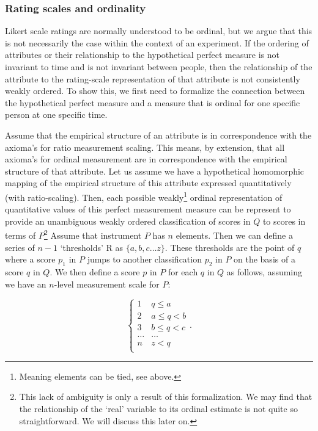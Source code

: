 \documentclass[utf8]{FrontiersinVancouver}
\begin{document}
\subsubsection{Rating scales and ordinality}
Likert scale ratings are normally understood to be ordinal, but we argue that this is not necessarily the case within the context of an experiment. If the ordering of attributes or their relationship to the hypothetical perfect measure is not invariant to time and is not invariant between people, then the relationship of the attribute to the rating-scale representation of that attribute is not consistently weakly ordered. To show this, we first need to formalize the connection between the hypothetical perfect measure and a measure that is ordinal for one specific person at one specific time.

Assume that the empirical structure of an attribute is in correspondence with the axioma's for ratio measurement scaling. This means, by extension, that all axioma's for ordinal measurement are in correspondence with the empirical structure of that attribute. Let us assume we have a hypothetical homomorphic mapping of the empirical structure of this attribute expressed quantitatively (with ratio-scaling). Then, each possible weakly\footnote{Meaning elements can be tied, see above.} ordinal representation of quantitative values of this perfect measurement measure can be represent to provide an unambiguous weakly ordered classification of scores in $Q$ to scores in terms of $P$\footnote{This lack of ambiguity is only a result of this formalization. We may find that the relationship of the `real' variable to its ordinal estimate is not quite so straightforward. We will discuss this later on.} Assume that instrument $P$ has $n$ elements. Then we can define a series of $n - 1$ `thresholds' R as $\{ a, b, c \ldots z \}$. These thresholds are the point of $q$ where a score $p_1$ in $P$ jumps to another classification $p_2$ in $P$ on the basis of a score $q$ in $Q$. We then define a score $p$ in $P$ for each $q$ in $Q$ as follows, assuming we have an $n$-level measurement scale for $P$:

\[
\begin{cases} 
    1 & q \leq a\\
    2 & a \leq q < b\\
    3 & b \leq q < c\\
    \ldots & \ldots\\    
    n & z < q\\
\end{cases}.
\]
\end{document}
